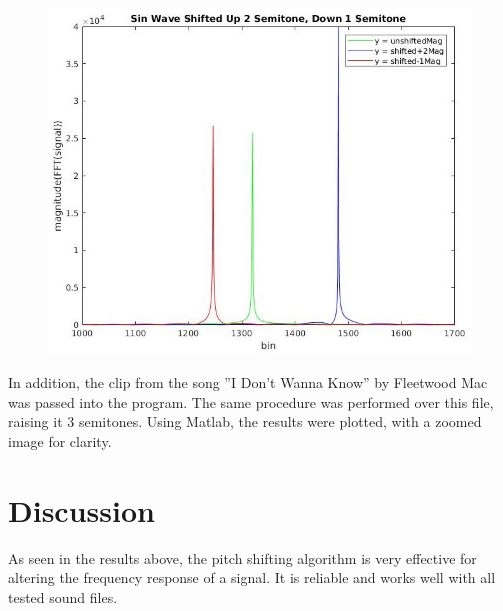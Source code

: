 \documentclass{article}
\begin{document}
\begin{figure}[h]
\includegraphics[width=.7\textwidth]{allsine.jpg}
\centering
\end{figure}

In addition, the clip from the song ''I Don’t Wanna Know'' by Fleetwood Mac was passed into the program. The same procedure was performed over this file, raising it 3 semitones. Using Matlab, the results were plotted, with a zoomed image for clarity.

\begin{figure}[h]
\hfill
{}
\hfill
{}
\hfill
\end{figure}

\section{Discussion}
As seen in the results above, the pitch shifting algorithm is very effective for altering the frequency response of a signal. It is reliable and works well with all tested sound files. 
\end{document}
